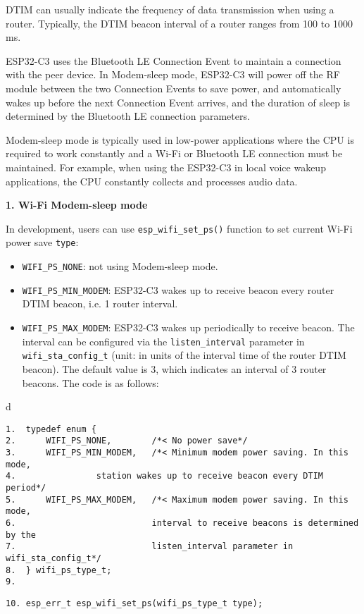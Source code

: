 \documentclass[a4paper,12pt]{book}
\begin{document}
DTIM can usually indicate the frequency of data transmission when using a router. Typically, the DTIM beacon interval of a router ranges from 100 to 1000 ms.

ESP32-C3 uses the Bluetooth LE Connection Event to maintain a connection with the peer device. In Modem-sleep mode, ESP32-C3 will power off the RF module between the two Connection Events to save power, and automatically wakes up before the next Connection Event arrives, and the duration of sleep is determined by the Bluetooth LE connection parameters.

Modem-sleep mode is typically used in low-power applications where the CPU is required to work constantly and a Wi-Fi or Bluetooth LE connection must be maintained. For example, when using the ESP32-C3 in local voice wakeup applications, the CPU constantly collects and processes audio data.

\textbf{1. Wi-Fi Modem-sleep mode}

In development, users can use \verb|esp_wifi_set_ps()| function to set current Wi-Fi power save \verb|type|:

\begin{itemize}[leftmargin=1em]
    \item \verb|WIFI_PS_NONE|: not using Modem-sleep mode.
    \item \verb|WIFI_PS_MIN_MODEM|: ESP32-C3 wakes up to receive beacon every router DTIM beacon, i.e. 1 router interval.
    \item \verb|WIFI_PS_MAX_MODEM|: ESP32-C3 wakes up periodically to receive beacon. The interval can be configured via the \verb|listen_interval| parameter in \verb|wifi_sta_config_t| (unit: in units of the interval time of the router DTIM beacon). The default value is 3, which indicates an interval of 3 router beacons. The code is as follows:
\end{itemize}

\begin{codebloc}
\begin{tabular}{d}
\vspace{2pt}
\begin{verbatim}
1.  typedef enum {
2.      WIFI_PS_NONE,        /*< No power save*/
3.      WIFI_PS_MIN_MODEM,   /*< Minimum modem power saving. In this mode,
4.                station wakes up to receive beacon every DTIM period*/
5.      WIFI_PS_MAX_MODEM,   /*< Maximum modem power saving. In this mode,
6.                           interval to receive beacons is determined by the
7.                           listen_interval parameter in wifi_sta_config_t*/
8.  } wifi_ps_type_t;
9.
\end{verbatim}
\verb|10. esp_err_t esp_wifi_set_ps(wifi_ps_type_t type);|
\end{tabular}
\end{codebloc}
\end{document}

